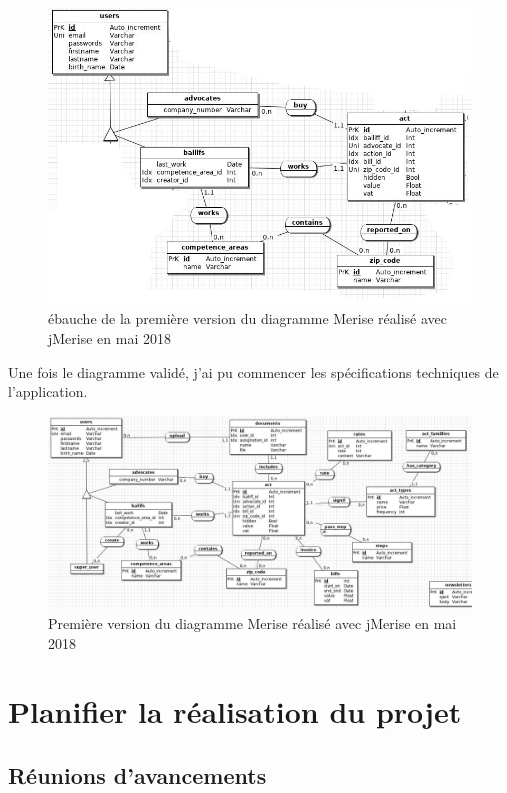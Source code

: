 \documentclass[]{report}
\begin{document}
      \begin{figure}
        \includegraphics[width=\linewidth]{img/merise_zoom.png}
        \caption{ébauche de la première version du diagramme Merise réalisé avec jMerise en mai 2018}
        \label{fig:merise_zoom}
      \end{figure}

      Une fois le diagramme validé, j'ai pu commencer les spécifications techniques de l'application.

      \begin{figure}
        \includegraphics[width=\linewidth]{img/merise.png}
        \caption{Première version du diagramme Merise réalisé avec jMerise en mai 2018}
        \label{fig:merise}
      \end{figure}

\chapter{Planifier la réalisation du projet}

  \section{Réunions d'avancements}
\end{document}
